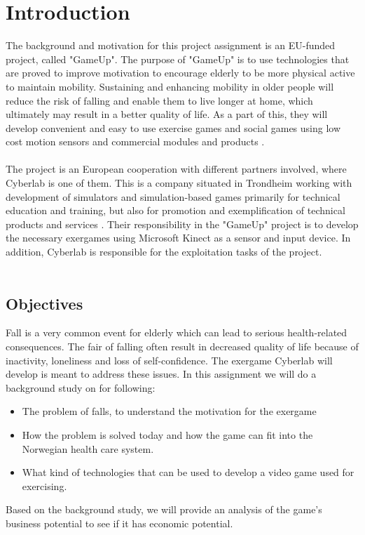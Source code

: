 \chapter{Introduction}
The background and motivation for this project assignment is an EU-funded project, called "GameUp". The purpose of "GameUp" is to use technologies that are proved to improve motivation to encourage elderly to be more physical active to maintain mobility. Sustaining and enhancing mobility in older people will reduce the risk of falling and enable them to live longer at home, which ultimately may result in a better quality of life. As a part of this, they will develop convenient and easy to use exercise games and social games using low cost motion sensors and commercial modules and products \cite{gameup}.\\ \\ The project is an European cooperation with different partners involved, where Cyberlab is one of them. This is a company situated in Trondheim working with development of simulators and simulation-based games primarily for technical education and training, but also for promotion and exemplification of technical products and services \cite{cyberlab}. Their responsibility in the "GameUp" project is to develop the necessary exergames using Microsoft Kinect as a sensor and input device. In addition, Cyberlab is responsible for the exploitation tasks of the project.  \\ \\

\section{Objectives}
Fall is a very common event for elderly which can lead to serious health-related consequences. The fair of falling often result in decreased quality of life because of inactivity, loneliness and loss of self-confidence. The exergame Cyberlab will develop is meant to address these issues. In this assignment we will do a background study on for following:
\begin{itemize}
\renewcommand{\labelitemi}{$\bullet$}
\item The problem of falls, to understand the motivation for the exergame 
\item How the problem is solved today and how the game can fit into the Norwegian health care system.
\item What kind of technologies that can be used to develop a video game used for exercising.
\end{itemize}
Based on the background study, we will provide an analysis of the game’s business potential to see if it has economic potential.

